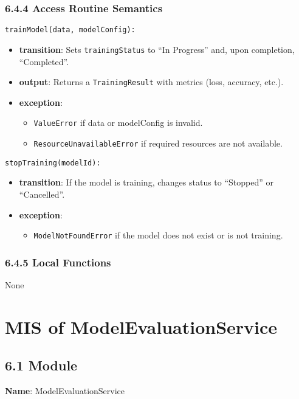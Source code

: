 \documentclass[12pt, titlepage]{article}
\begin{document}
\subsubsection{6.4.4 Access Routine Semantics}
\noindent \texttt{trainModel(data, modelConfig):}
\begin{itemize}
    \item \textbf{transition}: Sets \texttt{trainingStatus} to ``In Progress'' and, upon completion, ``Completed''.
    \item \textbf{output}: Returns a \texttt{TrainingResult} with metrics (loss, accuracy, etc.).
    \item \textbf{exception}:
    \begin{itemize}
        \item \texttt{ValueError} if data or modelConfig is invalid.
        \item \texttt{ResourceUnavailableError} if required resources are not available.
    \end{itemize}
\end{itemize}

\noindent \texttt{stopTraining(modelId):}
\begin{itemize}
    \item \textbf{transition}: If the model is training, changes status to ``Stopped'' or ``Cancelled''.
    \item \textbf{exception}:
    \begin{itemize}
        \item \texttt{ModelNotFoundError} if the model does not exist or is not training.
    \end{itemize}
\end{itemize}

\subsubsection{6.4.5 Local Functions}
None

\newpage


\section{MIS of ModelEvaluationService}
\label{sec:ModelEvaluationService}

\subsection{6.1 Module}
\textbf{Name}: ModelEvaluationService
\end{document}
